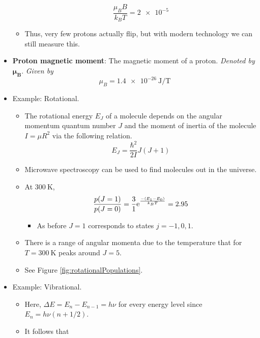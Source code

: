 \documentclass[../notes.tex]{subfiles}
\begin{document}
\begin{itemize}
\begin{itemize}
        \begin{equation*}
            \frac{\mu_BB}{k_BT} = \num{2e-5}
        \end{equation*}
        \item Thus, very few protons actually flip, but with modern technology we can still measure this.
    \end{itemize}
    \item \textbf{Proton magnetic moment}: The magnetic moment of a proton. \emph{Denoted by} $\bm{\mu_B}$. \emph{Given by}
    \begin{equation*}
        \mu_B = \SI[per-mode=symbol]{1.4e-26}{\joule\per\tesla}
    \end{equation*}
    \item Example: Rotational.
    \begin{itemize}
        \item The rotational energy $E_J$ of a molecule depends on the angular momentum quantum number $J$ and the moment of inertia of the molecule $I=\mu R^2$ via the following relation.
        \begin{equation*}
            E_J = \frac{\hbar^2}{2I}J(J+1)
        \end{equation*}
        \item Microwave spectroscopy can be used to find molecules out in the universe.
        \item At $\SI{300}{\kelvin}$,
        \begin{equation*}
            \frac{p(J=1)}{p(J=0)} = \frac{3}{1}\e[\frac{-(E_1-E_0)}{k_BT}] = 2.95
        \end{equation*}
        \begin{itemize}
            \item As before $J=1$ corresponds to states $j=-1,0,1$.
        \end{itemize}
        \item There is a range of angular momenta due to the temperature that for $T=\SI{300}{\kelvin}$ peaks around $J=5$.
        \item See Figure \ref{fig:rotationalPopulations}.
    \end{itemize}
    \item Example: Vibrational.
    \begin{itemize}
        \item Here, $\Delta E=E_n-E_{n-1}=h\nu$ for every energy level since $E_n=h\nu(n+1/2)$.
        \item It follows that
        \begin{equation*}

\end{equation*}
\end{itemize}
\end{itemize}
\end{document}
